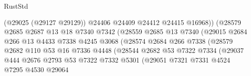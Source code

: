 \begin{lexlean}{RustStd}
\begin{coremodule}
                                    (@29025 (@29127 @29129))
                                    @24406
                                    @24409
                                    @24412
                                    @24415
                                    @16968))
                                (@28579
                                  @2685
                                  @2687
                                  @13
                                  @18
                                  @7340
                                  @7342
                                  (@28559
                                    @2685
                                    @13
                                    @7340
                                    (@29015
                                      @2684
                                      @266
                                      @13
                                      @4433
                                      @7338
                                      @4245
                                      @3068
                                      (@28574
                                        @2684
                                        @266
                                        @7338
                                        (@28579
                                          @2682
                                          @110
                                          @53
                                          @16
                                          @7336
                                          @4448
                                          (@28544
                                            @2682
                                            @53
                                            @7322
                                            @7334
                                            (@29037
                                              @444
                                              @2676
                                              @2793
                                              @53
                                              @7322
                                              @7332
                                              @5301
                                              (@29051
                                                @7321
                                                @7331
                                                @4524
                                                @7295
                                                @4530
                                                @29064

\end{coremodule}
\end{lexlean}
